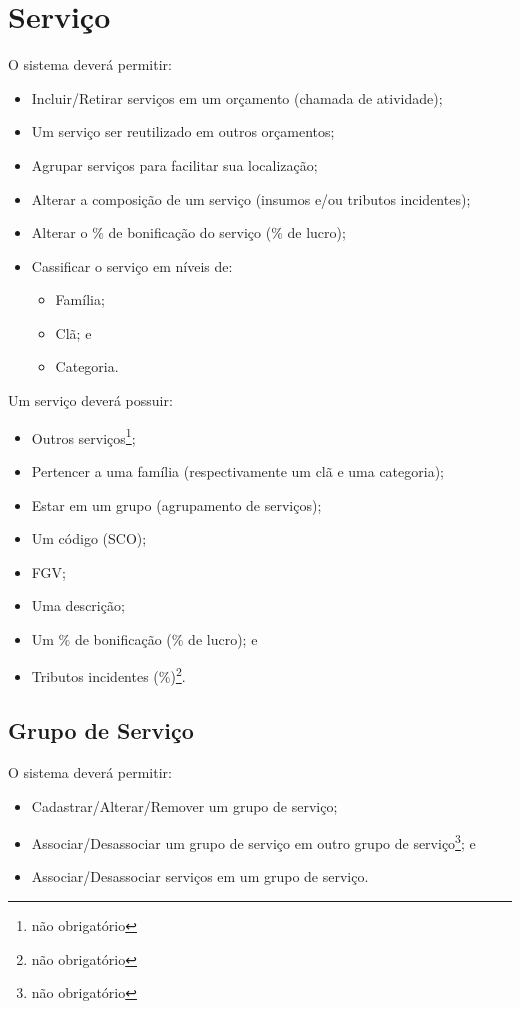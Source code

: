 \chapter{Serviço}

O sistema deverá permitir:

\begin{itemize}
	\item Incluir/Retirar serviços em um orçamento (chamada de atividade);
	\item Um serviço ser reutilizado em outros orçamentos;
	\item Agrupar serviços para facilitar sua localização;
	\item Alterar a composição de um serviço (insumos e/ou tributos incidentes);
	\item Alterar o \% de bonificação do serviço (\% de lucro);
	\item Cassificar o serviço em níveis de:
	\begin{itemize}
		\item Família;
		\item Clã; e
		\item Categoria.
	\end{itemize}
\end{itemize}

Um serviço deverá possuir:

\begin{itemize}
	\item Outros serviços\footnote{não obrigatório};
	\item Pertencer a uma família (respectivamente um clã e uma categoria);
	\item Estar em um grupo (agrupamento de serviços);
	\item Um código (SCO);
	\item FGV;
	\item Uma descrição;
	\item Um \% de bonificação (\% de lucro); e
	\item Tributos incidentes (\%)\footnote{não obrigatório}.
\end{itemize}

\section{Grupo de Serviço}

O sistema deverá permitir:

\begin{itemize}
	\item Cadastrar/Alterar/Remover um grupo de serviço;
	\item Associar/Desassociar um grupo de serviço em outro grupo de serviço\footnote{não obrigatório}; e
	\item Associar/Desassociar serviços em um grupo de serviço.
\end{itemize}

